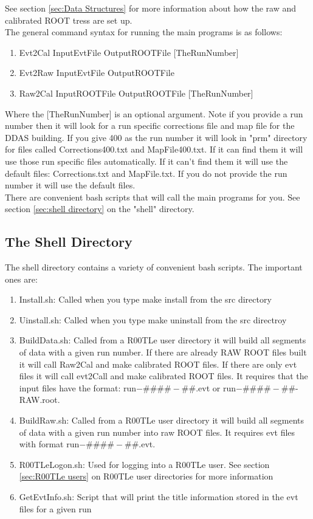 \documentclass[paper=a4, fontsize=12pt]{scrartcl} %
\numberwithin{equation}{section} %
\numberwithin{figure}{section} %
\numberwithin{table}{section} %
\begin{document}
See section \ref{sec:Data Structures} for more information about how the raw and calibrated ROOT tress are set up.  \\

The general command syntax for running the main programs is as follows:
\begin{enumerate}
\item Evt2Cal InputEvtFile OutputROOTFile [TheRunNumber]
\item Evt2Raw InputEvtFile OutputROOTFile
\item Raw2Cal InputROOTFile OutputROOTFile [TheRunNumber]
\end{enumerate}

Where the [TheRunNumber] is an optional argument.  Note if you provide a run number then it will look for a run specific corrections file and map file for the DDAS building.  If you give 400 as the run number it will look in "prm" directory for files called Corrections400.txt and MapFile400.txt.  If it can find them it will use those run specific files automatically.  If it can't find them it will use the default files: Corrections.txt and MapFile.txt.  If you do not provide the run number it will use the default files.\\

There are convenient bash scripts that will call the main programs for you.  See section \ref{sec:shell directory} on the "shell" directory.


\subsection{The Shell Directory}

The shell directory contains a variety of convenient bash scripts.  The important ones are:
\begin{enumerate}
\item Install.sh: Called when you type make install from the src directory
\item Uinstall.sh: Called when you type make uninstall from the src directroy
\item BuildData.sh: Called from a R00TLe user directory it will build all segments of data with a given run number.  If there are already RAW ROOT files built it will call Raw2Cal and make calibrated ROOT files.  If there are only evt files it will call evt2Call and make calibrated ROOT files.  It requires that the input files have the format: run$-\#\#\#\#-\#\#$.evt or run$-\#\#\#\#-\#\#$-RAW.root.

\item BuildRaw.sh:  Called from a R00TLe user directory it will build all segments of data with a given run number into raw ROOT files.  It requires evt files with format run$-\#\#\#\#-\#\#$.evt.
\item R00TLeLogon.sh: Used for logging into a R00TLe user.  See section \ref{sec:R00TLe users} on R00TLe user directories for more information
\item GetEvtInfo.sh: Script that will print the title information stored in the evt files for a given run
\end{enumerate}
\end{document}
